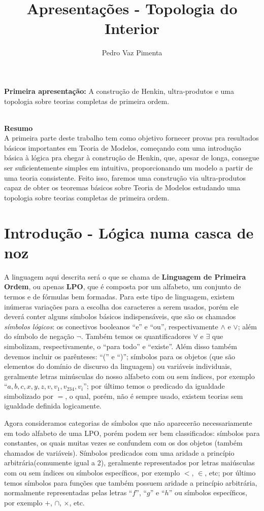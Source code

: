 \documentclass[11pt,a4paper]{article}
\title{Apresentações - Topologia do Interior}
\author{Pedro Vaz Pimenta}
\theoremstyle{definition}
\begin{document}
\maketitle

{\Large \textbf{Primeira apresentação:} A construção de Henkin, ultra-produtos e uma topologia sobre teorias completas de primeira ordem.}

\ \\

{\Large \textbf{Resumo}}  \\


{\small A primeira parte deste trabalho tem como objetivo fornecer provas pra resultados básicos importantes em Teoria de Modelos, começando com uma introdução básica à lógica pra chegar à construção de Henkin, que, apesar de longa, consegue ser suficientemente simples em intuitiva, proporcionando um modelo a partir de uma teoria consistente. Feito isso, faremos uma construção via ultra-produtos capaz de obter os teoremas básicos sobre Teoria de Modelos estudando uma topologia sobre teorias completas de primeira ordem. }

\section{Introdução - Lógica numa casca de noz}

A linguagem aqui descrita será o que se chama de \textbf{Linguagem de Primeira Ordem}, ou apenas \textbf{LPO}, que é composta por um alfabeto, um conjunto de termos e de fórmulas bem formadas. Para este tipo de linguagem, existem inúmeras variações para a escolha dos caracteres a serem usados, porém ele deverá conter alguns símbolos básicos indispensáveis, que são os chamados \textit{símbolos lógicos}: os conectivos booleanos ``e'' e ``ou'', respectivamente $\wedge$ e $\vee$; além do símbolo de negação $\neg$. Também temos os quantificadores $\forall$ e $\exists$ que simbolizam, respectivamente, o ``para todo'' e ``existe''. Além disso também devemos incluir os parênteses: ``('' e ``)''; símbolos para os objetos (que são elementos do domínio de discurso da linguagem) ou variáveis individuais, geralmente letras minúsculas do nosso alfabeto com ou sem índices, por exemplo ``$a,b,c,x,y,z,v,v_1,v_{234},v_i$''; por último temos o predicado da igualdade simbolizado por $=$, o qual, porém, não é sempre usado, existem teorias sem igualdade definida logicamente. 

Agora consideramos categorias de símbolos que não aparecerão necessariamente em todo alfabeto de uma LPO, porém podem ser bem classificados: símbolos para constantes, os quais muitas vezes se confundem com os dos objetos (também chamados de variáveis). Símbolos predicados com uma aridade a princípio arbitrária(comumente igual a 2), geralmente representados por letras maiúsculas com ou sem índices ou símbolos específicos, por exemplo $<$, $\in$, etc; por último temos símbolos para funções que também possuem aridade a princípio arbitrária, normalmente representadas pelas letras ``$f$'', ``$g$'' e ``$h$'' ou símbolos específicos, por exemplo $+$, $\cap$, $\times$, etc. 
\end{document}
